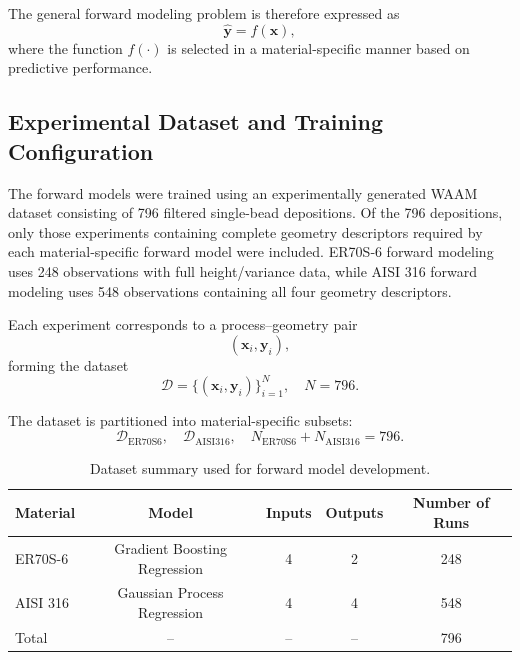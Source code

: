 \documentclass[11pt]{article}
\begin{document}
The general forward modeling problem is therefore expressed as
\begin{equation}
\hat{\mathbf{y}} = f(\mathbf{x}),
\end{equation}
where the function $f(\cdot)$ is selected in a material-specific manner based on predictive performance.


\subsection{Experimental Dataset and Training Configuration}

The forward models were trained using an experimentally generated WAAM dataset consisting of 796 filtered single-bead depositions. Of the 796 depositions, only those experiments containing complete geometry descriptors required by each material‑specific forward model were included. ER70S‑6 forward modeling uses 248 observations with full height/variance data, while AISI 316 forward modeling uses 548 observations containing all four geometry descriptors.

Each experiment corresponds to a process--geometry pair
\begin{equation}
(\mathbf{x}_i, \mathbf{y}_i),
\end{equation}
forming the dataset
\begin{equation}
\mathcal{D} = \{(\mathbf{x}_i,\mathbf{y}_i)\}_{i=1}^{N}, \quad N = 796.
\end{equation}

The dataset is partitioned into material-specific subsets:
\begin{equation}
\mathcal{D}_{\mathrm{ER70S6}}, \quad \mathcal{D}_{\mathrm{AISI316}}, \quad
N_{\mathrm{ER70S6}} + N_{\mathrm{AISI316}} = 796.
\end{equation}

\begin{table}[htbp]
\centering
\caption{Dataset summary used for forward model development.}
\label{tab:forward_dataset_summary}
\begin{tabular}{lcccc}
\hline
Material & Model & Inputs & Outputs & Number of Runs \\
\hline
ER70S-6 & Gradient Boosting Regression & 4 & 2 & 248 \\
AISI 316 & Gaussian Process Regression & 4 & 4 & 548 \\
\hline
Total & -- & -- & -- & 796 \\
\hline
\end{tabular}
\end{table}
\end{document}
